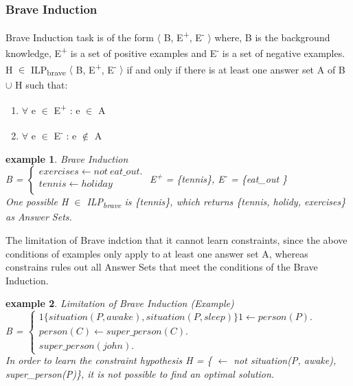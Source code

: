 \documentclass[12pt,twoside]{report}
\newtheorem{examp}{example}[section]
\begin{document}
\label{limitation_cautious}

\subsubsection{Brave Induction}
Brave Induction task is of the form $\langle$ B, E\textsuperscript{+}, E\textsuperscript{-} $\rangle$ where, B is the background knowledge, E\textsuperscript{+} is a set of positive examples and E\textsuperscript{-} is a set of negative examples.
 H $\in$ ILP\textsubscript{brave} $\langle$ B, E\textsuperscript{+}, E\textsuperscript{-} $\rangle$ if and only if there is at least one answer set A of B $\cup$ H such that: \\
\begin{enumerate}
\item $\forall$ e $\in$ E\textsuperscript{+} : e $\in$ A \\
\item $\forall$ e $\in$ E\textsuperscript{-} : e $\notin$ A \\
\end{enumerate}

\begin{examp} \normalfont Brave Induction \\

B = $\begin{cases}
	exercises  \leftarrow not \ eat\_out. \\
	tennis \leftarrow holiday \\
      \end{cases}$
E\textsuperscript{+} = \{tennis\},   E\textsuperscript{-} = \{eat\_out \} \\

One possible  H $\in$ ILP\textsubscript{brave} is \{tennis\}, which returns \{tennis, holidy, exercises\} as Answer Sets.
\end{examp} 
\label{brave_induction_example}

The limitation of Brave indction that it cannot learn constraints, since the above conditions of examples only apply to at least one answer set A, whereas constrains rules out all Answer Sets that meet  the conditions of the Brave Induction. 

\begin{examp} \normalfont Limitation of Brave Induction (Example) \\

B = $\begin{cases}
	1\{situation(P, awake), situation(P, sleep)\}1 \leftarrow person(P). \\
	person(C) \leftarrow super\_person(C). \\
	super\_person(john).
	\end{cases}$ \\

In order to learn the  constraint hypothesis H = \{ $\leftarrow$ not situation(P, awake), super\_person(P)\}, it is not possible to find an optimal solution.
\end{examp}
\label{limitation_brave}
\end{document}
